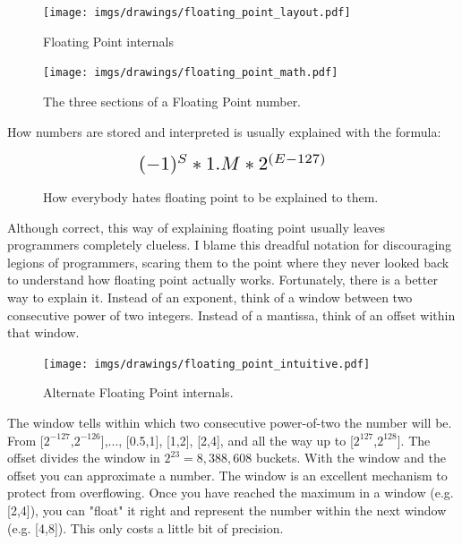 \documentclass[book.tex]{subfiles}
\begin{document}
\begin{figure}[H]
\centering
\texttt{[image: imgs/drawings/floating\_point\_layout.pdf]}
\caption{Floating Point internals}
\end{figure}
  \bigskip



\begin{figure}[H]
\centering
\texttt{[image: imgs/drawings/floating\_point\_math.pdf]}
\caption{The three sections of a Floating Point number.}
\end{figure}
  \bigskip  


How numbers are stored and interpreted is usually explained with the formula:\\
\par
\begin{figure}[H]
\begin{equation*}\label{eq:fp}
\scalebox{1.5}{
$(-1)^S * 1.M * 2^{(E-127)}$
}
\end{equation*}
 \caption{How everybody hates floating point to be explained to them.}
\end{figure}
\bigskip  

Although correct, this way of explaining floating point usually leaves programmers completely clueless. I blame this dreadful notation for discouraging legions of programmers, scaring them to the point where they never looked back to understand how floating point actually works. Fortunately, there is a better way to explain it. Instead of an exponent, think of a window between two consecutive power of two integers. Instead of a mantissa, think of an offset within that window.\\ 
\par
  
\begin{figure}[H]
\centering
\texttt{[image: imgs/drawings/floating\_point\_intuitive.pdf]}
\caption{Alternate Floating Point internals.}
\end{figure}
  \bigskip  
The window tells within which two consecutive power-of-two the number will be. From [$2^{-127}$,$2^{-126}$],..., [0.5,1], [1,2], [2,4], and all the way up to [$2^{127}$,$2^{128}$]. The offset divides the window in $ 2^{23} = 8,388,608 $  buckets. With the window and the offset you can approximate a number. The window is an excellent mechanism to protect from overflowing. Once you have reached the maximum in a window (e.g. [2,4]), you can "float" it right and represent the number within the next window (e.g. [4,8]). This only costs a little bit of precision.\\
\end{document}
